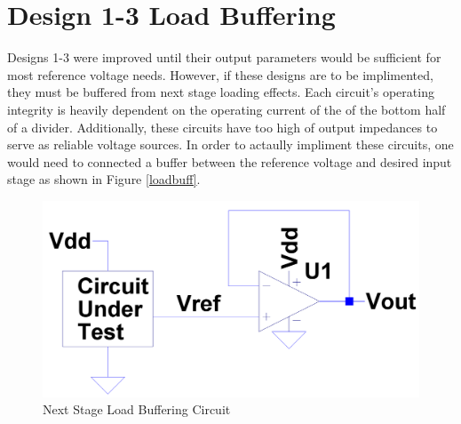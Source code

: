 \documentclass[conference]{IEEEtran}
\begin{document}
\section{Design 1-3 Load Buffering}
	\label{sec:Buff}
Designs 1-3 were improved until their output parameters would be sufficient for most reference voltage needs.  However, if these designs are to be implimented, they must be buffered from next stage loading effects.  Each circuit's operating integrity is heavily dependent on the operating current of the of the bottom half of a divider.  Additionally, these circuits have too high of output impedances to serve as reliable voltage sources.  In order to actaully impliment these circuits, one would need to connected a buffer between the reference voltage and desired input stage as shown in Figure \ref{loadbuff}.
\begin{figure}[!htbp]
  	\centering
  	\includegraphics[scale=0.15]{images/loadbuff.png}
  	\caption[loadbuff]{Next Stage Load Buffering Circuit}
  	\label{fig:loadbuff}
	\end{figure}

\end{document}
